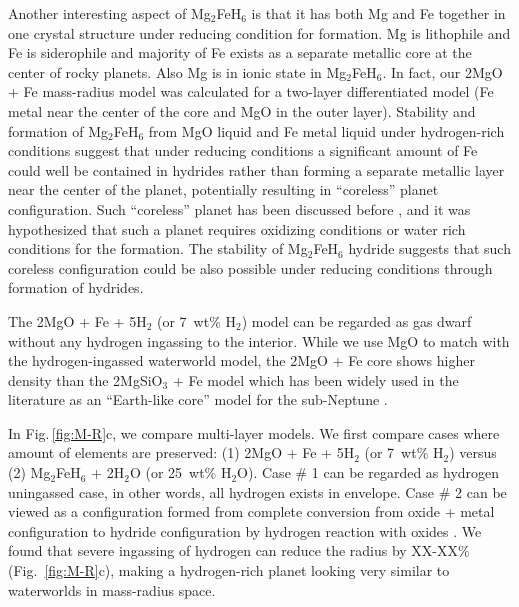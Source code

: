 \documentclass[draft,jgrga,12pt]{agujournal2019}
\begin{document}
Another interesting aspect of Mg$_2$FeH$_6$ is that it has both Mg and Fe together in one crystal structure under reducing condition for formation.
Mg is lithophile and Fe is siderophile and majority of Fe exists as a separate metallic core at the center of rocky planets.
Also Mg is in ionic state in Mg$_2$FeH$_6$.
In fact, our 2MgO + Fe mass-radius model was calculated for a two-layer differentiated model (Fe metal near the center of the core and MgO in the outer layer). 
Stability and formation of Mg$_2$FeH$_6$ from MgO liquid and Fe metal liquid under hydrogen-rich conditions \cite{kim_stability_2023} suggest that under reducing conditions a significant amount of Fe could well be contained in hydrides rather than forming a separate metallic layer near the center of the planet, potentially resulting in ``coreless'' planet configuration.
Such ``coreless'' planet has been discussed before \cite{elkins-tanton_coreless_2008}, and it was hypothesized that such a planet requires oxidizing conditions or water rich conditions for the formation.  
The stability of Mg$_2$FeH$_6$ hydride suggests that such coreless configuration could be also possible under reducing conditions through formation of hydrides.

The 2MgO + Fe + 5H$_2$ (or 7~wt\% H$_2$) model can be regarded as gas dwarf without any hydrogen ingassing to the interior.
While we use MgO to match with the hydrogen-ingassed waterworld model, the 2MgO + Fe core shows higher density than the 2MgSiO$_3$ + Fe model which has been widely used in the literature as an ``Earth-like core'' model for the sub-Neptune \cite{valencia_internal_2006, sotin_mass_2007, zeng_detailed_2013}.

In Fig.\,\ref{fig:M-R}c, we compare multi-layer models.
We first compare cases where amount of elements are preserved: (1) 2MgO + Fe + 5H$_2$ (or 7~wt\% H$_2$) versus (2) Mg$_2$FeH$_6$ + 2H$_2$O (or 25~wt\% H$_2$O).
Case \# 1 can be regarded as hydrogen uningassed case, in other words, all hydrogen exists in envelope.
Case \# 2 can be viewed as a configuration formed from complete conversion from oxide + metal configuration to hydride configuration by hydrogen reaction with oxides \cite{horn_building_2025, kim_stability_2023}.
We found that severe ingassing of hydrogen can reduce the radius by XX-XX\% (Fig.~\ref{fig:M-R}c), making a hydrogen-rich planet looking very similar to waterworlds in mass-radius space.
\end{document}
